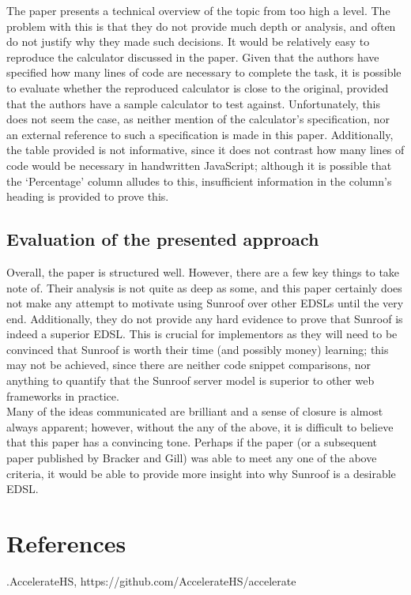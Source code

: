 \documentclass[9pt]{report}
\begin{document}
\noindent
The paper presents a technical overview of the topic from too high a level.
The problem with this is that they do not provide much depth or analysis, and often do not justify why they made such decisions.
It would be relatively easy to reproduce the calculator discussed in the paper.
Given that the authors have specified how many lines of code are necessary to complete the task, it is possible to evaluate whether the reproduced calculator is close to the original, provided that the authors have a sample calculator to test against.
Unfortunately, this does not seem the case, as neither mention of the calculator's specification, nor an external reference to such a specification is made in this paper.
Additionally, the table provided is not informative, since it does not contrast how many lines of code would be necessary in handwritten JavaScript; although it is possible that the `Percentage' column alludes to this, insufficient information in the column's heading is provided to prove this.

\subsection*{Evaluation of the presented approach}
Overall, the paper is structured well.
However, there are a few key things to take note of.
Their analysis is not quite as deep as some, and this paper certainly does not make any attempt to motivate using Sunroof over other EDSLs until the very end.
Additionally, they do not provide any hard evidence to prove that Sunroof is indeed a superior EDSL.
This is crucial for implementors as they will need to be convinced that Sunroof is worth their time (and possibly money) learning; this may not be achieved, since there are neither code snippet comparisons, nor anything to quantify that the Sunroof server model is superior to other web frameworks in practice.\\

Many of the ideas communicated are brilliant and a sense of closure is almost always apparent; however, without the any of the above, it is difficult to believe that this paper has a convincing tone.
Perhaps if the paper (or a subsequent paper published by Bracker and Gill) was able to meet any one of the above criteria, it would be able to provide more insight into why Sunroof is a desirable EDSL.

\section*{References}
.\hspace{5mm}AccelerateHS, https://github.com/AccelerateHS/accelerate\\
\end{document}
